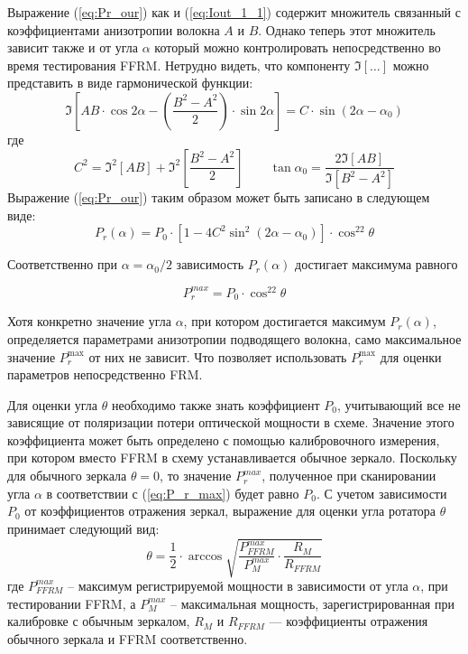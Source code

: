 \documentclass{article}
\begin{document}
Выражение (\ref{eq:Pr_our}) как и (\ref{eq:Iout_1_1}) содержит множитель связанный с коэффициентами анизотропии волокна $A$ и $B$. Однако теперь этот множитель зависит также и от угла $\alpha$ который можно контролировать непосредственно во время тестирования FFRM. Нетрудно видеть, что компоненту $\Im[\ldots]$ можно представить в виде гармонической функции:
\begin{equation}
    \Im\left[A B\cdot \cos2\alpha -\left( \frac{B^2-A^2}{2} \right)\cdot\sin2\alpha\right] = C\cdot\sin(2\alpha-\alpha_0)
\end{equation}
где
\begin{equation}
    C^2=\Im^2[AB]+\Im^2\left[\frac{B^2-A^2}{2}\right] \qquad \tan\alpha_0=\frac{2\Im[AB]}{\Im[B^2-A^2]}
\end{equation}
Выражение (\ref{eq:Pr_our}) таким образом может быть записано в следующем виде:
\begin{equation}
    \label{eq:Pr_our_1}
    P_r(\alpha)=P_0\cdot\left[1-4C^2\sin^2(2\alpha-\alpha_0)\right]\cdot\cos^22\theta
\end{equation}

Соответственно при $\alpha=\alpha_0/2$ зависимость $P_r(\alpha)$ достигает максимума равного

\begin{equation}
    \label{eq:P_r_max}
    P_r^{max}=P_0\cdot\cos^22\theta
\end{equation} 

Хотя конкретно значение угла $\alpha$, при котором достигается максимум $P_r(\alpha)$, определяется параметрами анизотропии подводящего волокна, само максимальное значение $P_r^{\max}$ от них не зависит.
Что позволяет использовать $P_r^{\max}$ для оценки параметров непосредственно FRM.

Для оценки угла $\theta$ необходимо также знать коэффициент $P_0$, учитывающий все не зависящие от поляризации потери оптической мощности в схеме.
Значение этого коэффициента может быть определено с помощью калибровочного измерения, при котором вместо FFRM в схему устанавливается обычное зеркало.
Поскольку для обычного зеркала $\theta = 0$, то значение $P_r^{max}$, полученное при сканировании угла $\alpha$ в соответствии с (\ref{eq:P_r_max}) будет равно $P_0$.
С учетом зависимости $P_0$ от коэффициентов отражения зеркал, выражение для оценки угла ротатора $\theta$ принимает следующий вид:
\begin{equation}
    \label{eq:theta}
    \theta =\frac{1}{2}\cdot\arccos\sqrt{\frac{P_{FFRM}^{max}}{P_M^{max}}\cdot\frac{R_M}{R_{FFRM}}}
\end{equation}
где $P_{FFRM}^{max}$ – максимум регистрируемой мощности в зависимости от угла $\alpha$, при тестировании FFRM, а $P_M^{max}$ – максимальная мощность, зарегистрированная при калибровке с обычным зеркалом, $R_M$ и $R_{FFRM}$ — коэффициенты отражения обычного зеркала и FFRM соответственно.
\end{document}
